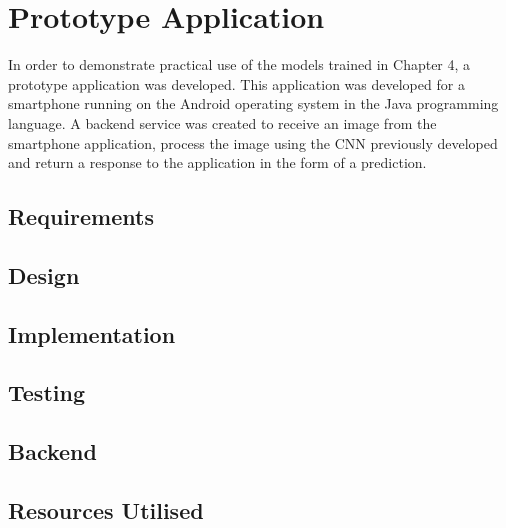 \chapter{Prototype Application}
\label{prototype}
In order to demonstrate practical use of the models trained in Chapter 4, a prototype application was developed.
This application was developed for a smartphone running on the Android operating system in the Java programming language.
A backend service was created to receive an image from the smartphone
application, process the image using the CNN previously developed and return a
response to the application in the form of a prediction.

\section{Requirements}


\section{Design}


\section{Implementation}


\section{Testing}


\section{Backend}


\section{Resources Utilised}

